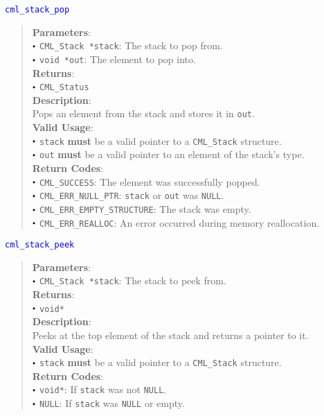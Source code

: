 \documentclass[a4paper,oneside,10pt]{article}
\newcommand{\function}[1]{
  \noindent\textcolor{blue}{\texttt{#1}}
  \vspace{-0.3em}
}
\renewcommand{\dot}{\raisebox{0.3ex}{\scalebox{0.6}{$\bullet$}}}
\theoremstyle{definition}
\begin{document}
\function{cml\_stack\_pop}
\begin{quote}
  \textbf{Parameters}: \\
  $\dot$ \texttt{CML\_Stack *stack}: The stack to pop from. \\
  $\dot$ \texttt{void *out}: The element to pop into. \\
  \textbf{Returns}: \\
  $\dot$ \texttt{CML\_Status} \\
  
  \vspace{-0.75em}
  \textbf{Description}: \\
  Pops an element from the stack and stores it in \texttt{out}. \\

  \vspace{-0.75em}
  \textbf{Valid Usage}: \\
  $\dot$ \texttt{stack} \textbf{must} be a valid pointer to a \texttt{CML\_Stack} structure. \\
  $\dot$ \texttt{out} \textbf{must} be a valid pointer to an element of the stack's type. \\

  \vspace{-0.75em}
  \textbf{Return Codes}: \\
  $\dot$ \texttt{CML\_SUCCESS}: The element was successfully popped. \\
  $\dot$ \texttt{CML\_ERR\_NULL\_PTR}: \texttt{stack} or \texttt{out} was \texttt{NULL}. \\
  $\dot$ \texttt{CML\_ERR\_EMPTY\_STRUCTURE}: The stack was empty. \\
  $\dot$ \texttt{CML\_ERR\_REALLOC}: An error occurred during memory reallocation. \\
\end{quote}

\function{cml\_stack\_peek}
\begin{quote}
  \textbf{Parameters}: \\
  $\dot$ \texttt{CML\_Stack *stack}: The stack to peek from. \\
  \textbf{Returns}: \\
  $\dot$ \texttt{void*} \\
  
  \vspace{-0.75em}
  \textbf{Description}: \\
  Peeks at the top element of the stack and returns a pointer to it. \\

  \vspace{-0.75em}
  \textbf{Valid Usage}: \\
  $\dot$ \texttt{stack} \textbf{must} be a valid pointer to a \texttt{CML\_Stack} structure. \\

  \vspace{-0.75em}
  \textbf{Return Codes}: \\
  $\dot$ \texttt{void*}: If \texttt{stack} was not \texttt{NULL}. \\
  $\dot$ \texttt{NULL}: If \texttt{stack} was \texttt{NULL} or empty. \\
\end{quote}
\end{document}
